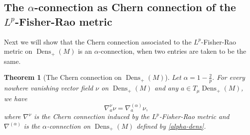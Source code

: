 \documentclass[11pt]{amsart}
\newtheorem{theorem}{Theorem}[section]
\theoremstyle{definition}
\newcommand{\Prob}{\operatorname{Prob}(M)}
\newcommand{\Dens}{\operatorname{Dens}_+(M)}
\begin{document}
\subsection{The $\alpha$-connection as Chern connection of the $L^p$-Fisher-Rao metric}
Next we will show that the Chern connection associated to the $L^p$-Fisher-Rao metric on $\Dens$ is an $\alpha$-connection, when two entries are taken to be the same. %
\begin{theorem}[The Chern connection on $\Dens$]\label{thm:chern_dens}
    Let $\alpha=1-\frac{2}{p}$. For every nowhere vanishing vector field $\nu$ on $\Dens$ and any $a\in T_\mu\Dens$, we have
    \begin{equation}\label{chern-dens}
    \nabla_a^\nu\nu=\nabla^{(\alpha)}_a\nu,
    \end{equation}
    where $\nabla^\nu$ is the Chern connection induced by the $L^p$-Fisher-Rao metric and $\nabla^{(\alpha)}$ is the $\alpha$-connection on $\Dens$ defined by \eqref{alpha-dens}.
\end{theorem}
\end{document}

